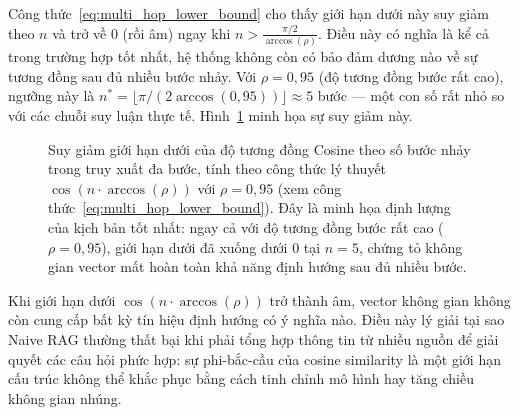 \documentclass[12pt,a4paper]{report}
\theoremstyle{plain}
\theoremstyle{definition}
\begin{document}
	Công thức~\eqref{eq:multi_hop_lower_bound} cho thấy giới hạn dưới này suy
	giảm theo $n$ và trở về $0$ (rồi âm) ngay khi $n > \frac{\pi/2}{\arccos(\rho)}$.
	Điều này có nghĩa là kể cả trong trường hợp tốt nhất, hệ thống không còn có
	bảo đảm dương nào về sự tương đồng sau đủ nhiều bước nhảy. Với $\rho = 0{,}95$
	(độ tương đồng bước rất cao), ngưỡng này là $n^* = \lfloor\pi/(2\arccos(0{,}95))\rfloor
	\approx 5$ bước --- một con số rất nhỏ so với các chuỗi suy luận thực tế.
	Hình~\ref{fig:cosine_decay} minh họa sự suy giảm này.
	
	\begin{figure}[htbp]
		\centering
		\caption{Suy giảm giới hạn dưới của độ tương đồng Cosine theo số bước nhảy
			trong truy xuất đa bước, tính theo công thức lý thuyết
			$\cos(n\cdot\arccos(\rho))$ với $\rho = 0{,}95$
			(xem công thức~\eqref{eq:multi_hop_lower_bound}).
			Đây là minh họa định lượng của kịch bản tốt nhất: ngay cả với độ tương đồng
			bước rất cao ($\rho=0{,}95$), giới hạn dưới đã xuống dưới $0$ tại $n=5$,
			chứng tỏ không gian vector mất hoàn toàn khả năng định hướng sau đủ nhiều bước.}
		\label{fig:cosine_decay}
	\end{figure}
	
	Khi giới hạn dưới $\cos(n\cdot\arccos(\rho))$ trở thành âm, vector không gian
	không còn cung cấp bất kỳ tín hiệu định hướng có ý nghĩa nào. Điều này lý giải
	tại sao Naive RAG thường thất bại khi phải tổng hợp thông tin từ nhiều nguồn để
	giải quyết các câu hỏi phức hợp: sự phi-bắc-cầu của cosine similarity là một
	giới hạn cấu trúc không thể khắc phục bằng cách tinh chỉnh mô hình hay tăng
	chiều không gian nhúng.
	
\end{document}

